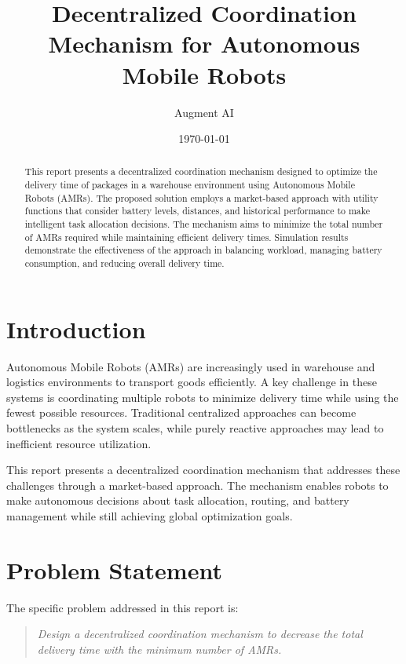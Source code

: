 \documentclass[12pt,a4paper]{article}
\title{Decentralized Coordination Mechanism for Autonomous Mobile Robots}
\author{Augment AI}
\date{\today}
\begin{document}
\maketitle

\begin{abstract}
This report presents a decentralized coordination mechanism designed to optimize the delivery time of packages in a warehouse environment using Autonomous Mobile Robots (AMRs). The proposed solution employs a market-based approach with utility functions that consider battery levels, distances, and historical performance to make intelligent task allocation decisions. The mechanism aims to minimize the total number of AMRs required while maintaining efficient delivery times. Simulation results demonstrate the effectiveness of the approach in balancing workload, managing battery consumption, and reducing overall delivery time.
\end{abstract}

\tableofcontents

\newpage

\section{Introduction}

Autonomous Mobile Robots (AMRs) are increasingly used in warehouse and logistics environments to transport goods efficiently. A key challenge in these systems is coordinating multiple robots to minimize delivery time while using the fewest possible resources. Traditional centralized approaches can become bottlenecks as the system scales, while purely reactive approaches may lead to inefficient resource utilization.

This report presents a decentralized coordination mechanism that addresses these challenges through a market-based approach. The mechanism enables robots to make autonomous decisions about task allocation, routing, and battery management while still achieving global optimization goals.

\section{Problem Statement}

The specific problem addressed in this report is:

\begin{quote}
\textit{Design a decentralized coordination mechanism to decrease the total delivery time with the minimum number of AMRs.}
\end{quote}
\end{document}

